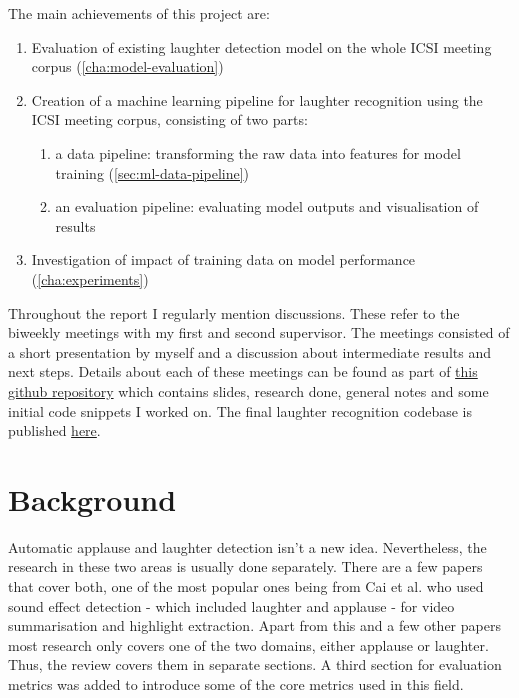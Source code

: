 \documentclass[bsc,frontabs,parskip,deptreport]{infthesis}
\begin{document}
The main achievements of this project are:
\begin{enumerate}
  \item Evaluation of existing laughter detection model on the whole ICSI meeting corpus (\autoref{cha:model-evaluation})
  \item Creation of a machine learning pipeline for laughter recognition using the ICSI meeting corpus, consisting of two parts:
  \begin{enumerate}
      \item a data pipeline: transforming the raw data into features for model training (\autoref{sec:ml-data-pipeline})
      \item an evaluation pipeline: evaluating model outputs and visualisation of results
  \end{enumerate}
  \item Investigation of impact of training data on model performance (\autoref{cha:experiments})
\end{enumerate}

Throughout the report I regularly mention discussions. These refer to the biweekly meetings with my first and second supervisor. The meetings consisted of a short presentation by myself and a discussion about intermediate results and next steps. Details about each of these meetings can be found as part of \href{https://github.com/LasseWolter/honours-project-21-22/tree/main/Meeting_Notes}{this github repository} which contains slides, research done, general notes and some initial code snippets I worked on. 
The final laughter recognition codebase is published \href{https://github.com/LasseWolter/laughter-detection-icsi}{here}.

\chapter{Background} \label{cha:bg}
Automatic applause and laughter detection isn't a new idea. Nevertheless, the research in these two areas is usually done separately. There are a few papers that cover both, one of the most popular ones being from Cai et al. \citep{cai2003highlight} who used sound effect detection - which included laughter and applause - for video summarisation and highlight extraction.
Apart from this and a few other papers most research only covers one of the two domains, either applause or laughter. Thus, the review covers them in separate sections. A third section for evaluation metrics was added to introduce some of the core metrics used in this field. 
\end{document}
